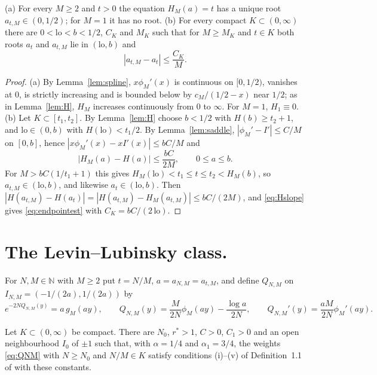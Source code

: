 \documentclass{math}
\newcommand{\N}{\mathbb N}
\begin{document}
\begin{lemma}\label{lem:endpoint}
\textup{(a)} For every $M\ge2$ and $t>0$ the equation $H_M(a)=t$ has a unique root $a_{t,M}\in(0,1/2)$; for $M=1$ it has no root. \textup{(b)} For every compact $K\subset(0,\infty)$ there are $0<\mathrm{lo}<b<1/2$, $C_K$ and $M_K$ such that for $M\ge M_K$ and $t\in K$ both roots $a_t$ and $a_{t,M}$ lie in $(\mathrm{lo},b)$ and
\begin{equation}\label{eq:endpointest}
|a_{t,M}-a_t|\le\frac{C_K}M .
\end{equation}
\end{lemma}

\begin{proof}
(a) By Lemma~\ref{lem:spline}, $x\phi_M'(x)$ is continuous on $[0,1/2)$, vanishes at $0$, is strictly increasing and is bounded below by $c_M/(1/2-x)$ near $1/2$; as in Lemma~\ref{lem:H}, $H_M$ increases continuously from $0$ to $\infty$. For $M=1$, $H_1\equiv0$. (b) Let $K\subset[t_1,t_2]$. By Lemma~\ref{lem:H} choose $b<1/2$ with $H(b)\ge t_2+1$, and $\mathrm{lo}\in(0,b)$ with $H(\mathrm{lo})<t_1/2$. By Lemma~\ref{lem:saddle}, $|\phi_M'-I'|\le C/M$ on $[0,b]$, hence $|x\phi_M'(x)-xI'(x)|\le bC/M$ and
\begin{equation}\label{eq:Hclose}
|H_M(a)-H(a)|\le\frac{bC}{2M},\qquad 0\le a\le b .
\end{equation}
For $M>bC(1/t_1+1)$ this gives $H_M(\mathrm{lo})<t_1\le t\le t_2<H_M(b)$, so $a_{t,M}\in(\mathrm{lo},b)$, and likewise $a_t\in(\mathrm{lo},b)$. Then $|H(a_{t,M})-H(a_t)|=|H(a_{t,M})-H_M(a_{t,M})|\le bC/(2M)$, and \eqref{eq:Hslope} gives \eqref{eq:endpointest} with $C_K=bC/(2\,\mathrm{lo})$.
\end{proof}

\section{The Levin--Lubinsky class.}\label{sec:classQ}
For $N,M\in\N$ with $M\ge2$ put $t=N/M$, $a=a_{N,M}=a_{t,M}$, and define $Q_{N,M}$ on $I_{N,M}=(-1/(2a),1/(2a))$ by
\begin{equation}\label{eq:QNM}
e^{-2NQ_{N,M}(y)}=a\,g_M(ay),\qquad Q_{N,M}(y)=\frac M{2N}\phi_M(ay)-\frac{\log a}{2N},\qquad Q_{N,M}'(y)=\frac{aM}{2N}\phi_M'(ay).
\end{equation}

\begin{lemma}\label{lem:classQ}
Let $K\subset(0,\infty)$ be compact. There are $N_0$, $r^*>1$, $C>0$, $C_1>0$ and an open neighbourhood $I_0$ of $\pm1$ such that, with $\alpha=1/4$ and $\alpha_1=3/4$, the weights \eqref{eq:QNM} with $N\ge N_0$ and $N/M\in K$ satisfy conditions \textup{(i)}--\textup{(v)} of Definition~\textup{1.1} of \cite{levinlubinsky2018} with these constants.
\end{lemma}
\end{document}
